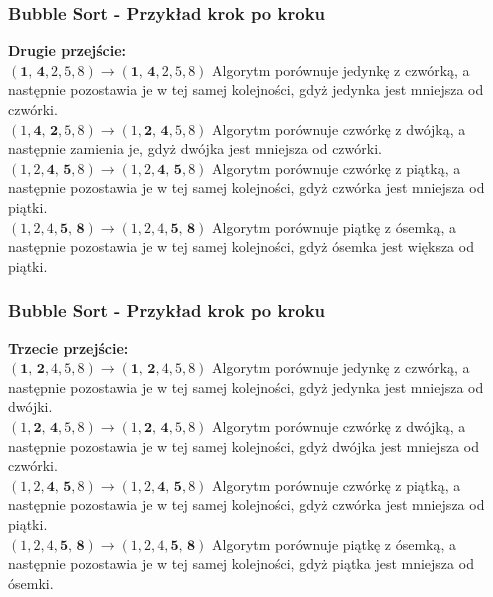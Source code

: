 \documentclass[kslide.tex]{subfiles}
\begin{document}
\begin{frame}
\frametitle{Bubble Sort - Przykład krok po kroku}
\textbf{Drugie przejście:}\\[0.1cm]
        $( \textbf{1, 4}, 2, 5, 8 ) \rightarrow ( \textbf{1, 4}, 2, 5, 8 )$ Algorytm porównuje jedynkę z czwórką, a następnie pozostawia je w tej samej kolejności, gdyż jedynka jest mniejsza od czwórki.\\[0.1cm]
        \pause
        $( 1, \textbf{4, 2}, 5, 8 ) \rightarrow ( 1, \textbf{2, 4}, 5, 8 )$ Algorytm porównuje czwórkę z dwójką, a następnie zamienia je, gdyż dwójka jest mniejsza od czwórki.\\[0.1cm]
        \pause
        $( 1, 2, \textbf{4, 5}, 8 ) \rightarrow ( 1, 2, \textbf{4, 5}, 8 )$ Algorytm porównuje czwórkę z piątką, a następnie pozostawia je w tej samej kolejności, gdyż czwórka jest mniejsza od piątki.\\[0.1cm]
        \pause
        $( 1, 2, 4, \textbf{5, 8} ) \rightarrow ( 1, 2, 4, \textbf{5, 8} )$ Algorytm porównuje piątkę z ósemką, a następnie pozostawia je w tej samej kolejności, gdyż ósemka jest większa od piątki.\\[0.1cm]
\end{frame}

\begin{frame}
\frametitle{Bubble Sort - Przykład krok po kroku}
\textbf{Trzecie przejście:}\\[0.1cm]
        $( \textbf{1, 2}, 4, 5, 8 ) \rightarrow ( \textbf{1, 2}, 4, 5, 8 )$ Algorytm porównuje jedynkę z czwórką, a następnie pozostawia je w tej samej kolejności, gdyż jedynka jest mniejsza od dwójki.\\[0.1cm]
        \pause
        $( 1, \textbf{2, 4}, 5, 8 ) \rightarrow ( 1, \textbf{2, 4}, 5, 8 )$ Algorytm porównuje czwórkę z dwójką, a następnie pozostawia je w tej samej kolejności, gdyż dwójka jest mniejsza od czwórki.\\[0.1cm]
        \pause
        $( 1, 2, \textbf{4, 5}, 8 ) \rightarrow ( 1, 2, \textbf{4, 5}, 8 )$ Algorytm porównuje czwórkę z piątką, a następnie pozostawia je w tej samej kolejności, gdyż czwórka jest mniejsza od piątki.\\[0.1cm]
        \pause
        $( 1, 2, 4, \textbf{5, 8} ) \rightarrow ( 1, 2, 4, \textbf{5, 8} )$ Algorytm porównuje piątkę z ósemką, a następnie pozostawia je w tej samej kolejności, gdyż piątka jest mniejsza od ósemki.\\[0.1cm]
\end{frame}
\end{document}
